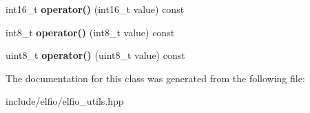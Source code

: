 \begin{DoxyCompactItemize}
\item 
int16\+\_\+t {\bfseries operator()} (int16\+\_\+t value) const \hypertarget{class_e_l_f_i_o_1_1endianess__convertor_a17703b2aaa2d4ef5fe8b5ffc6caa46cd}{}\label{class_e_l_f_i_o_1_1endianess__convertor_a17703b2aaa2d4ef5fe8b5ffc6caa46cd}

\item 
int8\+\_\+t {\bfseries operator()} (int8\+\_\+t value) const \hypertarget{class_e_l_f_i_o_1_1endianess__convertor_a3ef2be6b589c14e899c0c9c566ea8c08}{}\label{class_e_l_f_i_o_1_1endianess__convertor_a3ef2be6b589c14e899c0c9c566ea8c08}

\item 
uint8\+\_\+t {\bfseries operator()} (uint8\+\_\+t value) const \hypertarget{class_e_l_f_i_o_1_1endianess__convertor_a4c463bdece3787cc56dd99227f6ba58c}{}\label{class_e_l_f_i_o_1_1endianess__convertor_a4c463bdece3787cc56dd99227f6ba58c}

\end{DoxyCompactItemize}


The documentation for this class was generated from the following file\+:\begin{DoxyCompactItemize}
\item 
include/elfio/elfio\+\_\+utils.\+hpp\end{DoxyCompactItemize}
